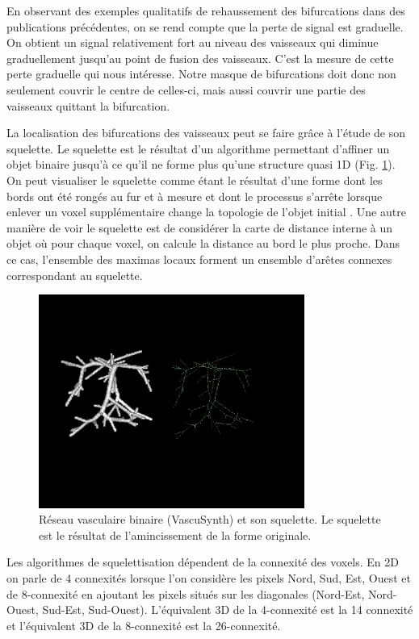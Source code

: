 En observant des exemples qualitatifs de rehaussement des bifurcations dans des publications précédentes, on se rend compte que la perte de signal est graduelle. On obtient un signal relativement fort au niveau des vaisseaux qui diminue graduellement jusqu'au point de fusion des vaisseaux. C'est la mesure de cette perte graduelle qui nous intéresse. Notre masque de bifurcations doit donc non seulement couvrir le centre de celles-ci, mais aussi couvrir une partie des vaisseaux quittant la bifurcation.

La localisation des bifurcations des vaisseaux peut se faire grâce à l'étude de son squelette. Le squelette est le résultat d'un algorithme permettant d'affiner un objet binaire jusqu'à ce qu'il ne forme plus qu'une structure quasi 1D (Fig. \ref{fig:vascu_skeleton}). On peut visualiser le squelette comme étant le résultat d'une forme dont les bords ont été rongés au fur et à mesure et dont le processus s'arrête lorsque enlever un voxel supplémentaire change la topologie de l'objet initial \cite{Lee1994_3D_skeleton}. Une autre manière de voir le squelette est de considérer la carte de distance interne à un objet où pour chaque voxel, on calcule la distance au bord le plus proche. Dans ce cas, l'ensemble des maximas locaux forment un ensemble d'arêtes connexes correspondant au squelette.

\begin{figure}[!ht]
  \centering
  \includegraphics[height=7cm]{Images/vascu_skeleton.png}
  \caption{Réseau vasculaire binaire (VascuSynth) et son squelette. Le squelette est le résultat de l'amincissement de la forme originale.}
  \label{fig:vascu_skeleton}
\end{figure}

Les algorithmes de squelettisation dépendent de la connexité des voxels. En 2D on parle de 4 connexités lorsque l'on considère les pixels Nord, Sud, Est, Ouest et de 8-connexité en ajoutant les pixels situés sur les diagonales (Nord-Est, Nord-Ouest, Sud-Est, Sud-Ouest). L'équivalent 3D de la 4-connexité est la 14 connexité et l'équivalent 3D de la 8-connexité est la 26-connexité.

